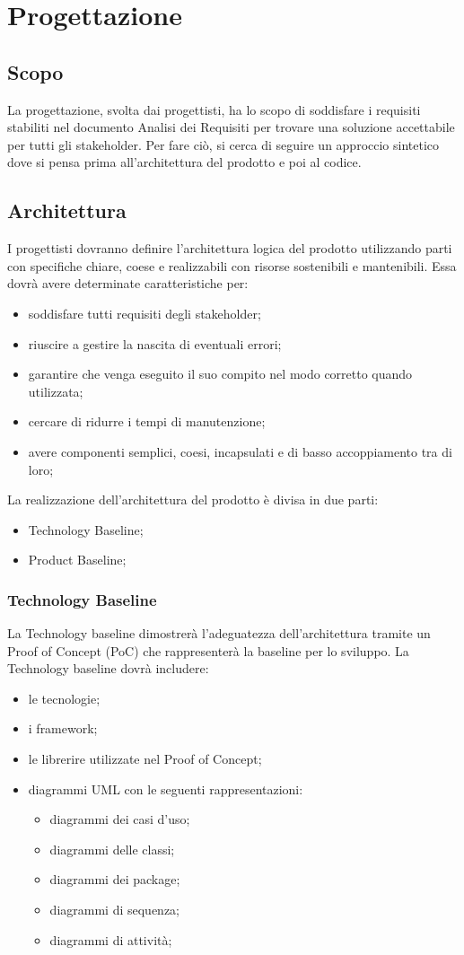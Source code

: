 
	\section{Progettazione}
	\subsection{Scopo}
	La progettazione, svolta dai progettisti, ha lo scopo di soddisfare i requisiti stabiliti nel documento Analisi dei Requisiti per trovare una soluzione accettabile per tutti gli stakeholder.
	Per fare ciò, si cerca di seguire un approccio sintetico dove si pensa prima all’architettura del prodotto e poi al codice.
	\subsection{Architettura}	I progettisti dovranno definire l’architettura logica del prodotto utilizzando parti con specifiche chiare, coese e realizzabili con risorse sostenibili e mantenibili. Essa dovrà avere determinate caratteristiche per:
	\begin{itemize}
		\item	soddisfare tutti requisiti degli stakeholder;
		\item	riuscire a gestire la nascita di eventuali errori;
		\item	garantire che venga eseguito il suo compito nel modo corretto quando utilizzata;
		\item	cercare di ridurre i tempi di manutenzione;
		\item   avere componenti semplici, coesi, incapsulati e di basso accoppiamento tra di loro;
	\end{itemize}
	La realizzazione dell’architettura del prodotto è divisa in due parti:
	\begin{itemize}
		\item Technology Baseline;
		\item Product Baseline;
	\end{itemize}
	\subsubsection{Technology Baseline}
	La Technology baseline dimostrerà l’adeguatezza dell’architettura tramite un Proof of Concept (PoC) che rappresenterà la baseline per lo sviluppo. 
	La Technology baseline dovrà includere:
	\begin{itemize}
		\item le tecnologie;
		\item i framework;
		\item le librerire utilizzate nel Proof of Concept;
		\item diagrammi UML con le seguenti rappresentazioni:
		\begin{itemize}
			\item 	diagrammi dei casi d’uso; 
			\item 	diagrammi delle classi; 
			\item 	diagrammi dei package;
			\item 	diagrammi di sequenza; 
			\item 	diagrammi di attività;
		\end{itemize}
	\end{itemize}
